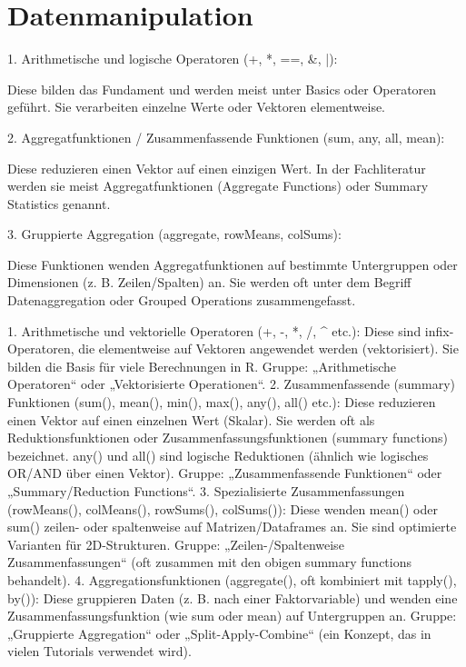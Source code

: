\documentclass[10pt,twocolumn]{scrartcl}
\begin{document}
\iffalse
    

\section{Datenmanipulation}

1. Arithmetische und logische Operatoren (+, *, ==, &, |):

    Diese bilden das Fundament und werden meist unter Basics oder Operatoren geführt. Sie verarbeiten einzelne Werte oder Vektoren elementweise.

2. Aggregatfunktionen / Zusammenfassende Funktionen (sum, any, all, mean):

    Diese reduzieren einen Vektor auf einen einzigen Wert. In der Fachliteratur werden sie meist Aggregatfunktionen (Aggregate Functions) oder Summary Statistics genannt.

3. Gruppierte Aggregation (aggregate, rowMeans, colSums):

    Diese Funktionen wenden Aggregatfunktionen auf bestimmte Untergruppen oder Dimensionen (z. B. Zeilen/Spalten) an. Sie werden oft unter dem Begriff Datenaggregation oder Grouped Operations zusammengefasst. 



1.    Arithmetische und vektorielle Operatoren (+, -, *, /, ^ etc.):
    Diese sind infix-Operatoren, die elementweise auf Vektoren angewendet werden (vektorisiert). Sie bilden die Basis für viele Berechnungen in R.
    Gruppe: „Arithmetische Operatoren“ oder „Vektorisierte Operationen“.
2.    Zusammenfassende (summary) Funktionen (sum(), mean(), min(), max(), any(), all() etc.):
    Diese reduzieren einen Vektor auf einen einzelnen Wert (Skalar). Sie werden oft als Reduktionsfunktionen oder Zusammenfassungsfunktionen (summary functions) bezeichnet.
    any() und all() sind logische Reduktionen (ähnlich wie logisches OR/AND über einen Vektor).
    Gruppe: „Zusammenfassende Funktionen“ oder „Summary/Reduction Functions“.
3.    Spezialisierte Zusammenfassungen (rowMeans(), colMeans(), rowSums(), colSums()):
    Diese wenden mean() oder sum() zeilen- oder spaltenweise auf Matrizen/Dataframes an. Sie sind optimierte Varianten für 2D-Strukturen.
    Gruppe: „Zeilen-/Spaltenweise Zusammenfassungen“ (oft zusammen mit den obigen summary functions behandelt).
4.    Aggregationsfunktionen (aggregate(), oft kombiniert mit tapply(), by()):
    Diese gruppieren Daten (z. B. nach einer Faktorvariable) und wenden eine Zusammenfassungsfunktion (wie sum oder mean) auf Untergruppen an.
    Gruppe: „Gruppierte Aggregation“ oder „Split-Apply-Combine“ (ein Konzept, das in vielen Tutorials verwendet wird).
\end{document}
